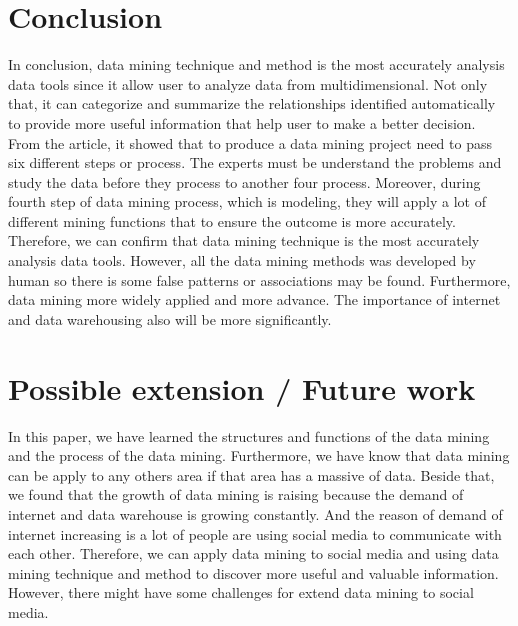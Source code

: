 \documentclass[a4paper,12pt]{article}
\begin{document}
\section{Conclusion}
\hspace*{1cm}In conclusion, data mining technique and method is the most accurately analysis data tools since it allow user to analyze data from multidimensional. Not only that, it can categorize and summarize the relationships identified automatically to provide more useful information that help user to make a better decision. From the article, it showed that to produce a data mining project need to pass six different steps or process. The experts must be understand the problems and study the data before they process to another four process. Moreover, during fourth step of data mining process, which is modeling, they will apply a lot of different mining functions that to ensure the outcome is more accurately. Therefore, we can confirm that data mining technique is the most accurately analysis data tools. However, all the data mining methods was developed by human so there is some false patterns or associations may be found. Furthermore, data mining more widely applied and more advance. The importance of internet and data warehousing also will be more significantly.  
\section{Possible extension / Future work}
\hspace{1cm}In this paper, we have learned the structures and functions of the data mining and the process of the data mining. Furthermore, we have know that data mining can be apply to any others area if that area has a massive of data. Beside that, we found that the growth of data mining is raising because the demand of internet and data warehouse is growing constantly. And the reason of demand of internet increasing is a lot of people are using social media to communicate with each other. Therefore, we can apply data mining to social media and using data mining technique and method to discover more useful and valuable information. However, there might have some challenges for extend data mining to social media.~\cite{smm2014}
{}
\end{document}
